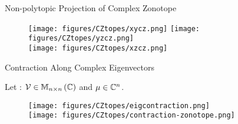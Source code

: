 \begin{frame}{Non-polytopic Projection of Complex Zonotope}
%
\begin{figure}
\center
\texttt{[image: figures/CZtopes/xycz.png]}
\texttt{[image: figures/CZtopes/yzcz.png]}\\
\texttt{[image: figures/CZtopes/xzcz.png]}
\end{figure}
%
\end{frame}


\begin{frame}{Contraction Along Complex Eigenvectors}

\begin{block}{}
{\small
Let :
$\mathcal{V}\in\mathbb{M}_{n\times n}\left(\mathbb{C}\right)$ and $\mu\in\mathbb{C}^n$.
}

\begin{enumerate}
\end{enumerate}
%
\end{block}
%
\begin{figure}
\center
\texttt{[image: figures/CZtopes/eigcontraction.png]}\\
\texttt{[image: figures/CZtopes/contraction-zonotope.png]}
\end{figure}
%
\end{frame}

